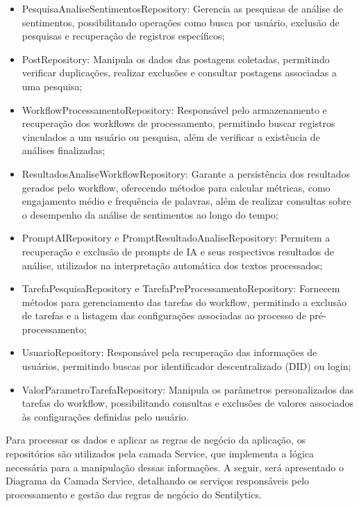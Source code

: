 \documentclass[
	12pt,				%
	oneside,			%
	a4paper,			%
	english,			%
	french,				%
	spanish,			%
	brazil				%
	]{abntex2}
\begin{document}
\begin{itemize}
\tightlist
\item
  PesquisaAnaliseSentimentosRepository: Gerencia as pesquisas de análise
  de sentimentos, possibilitando operações como busca por usuário,
  exclusão de pesquisas e recuperação de registros específicos;
\item
  PostRepository: Manipula os dados das postagens coletadas, permitindo
  verificar duplicações, realizar exclusões e consultar postagens
  associadas a uma pesquisa;
\item
  WorkflowProcessamentoRepository: Responsável pelo armazenamento e
  recuperação dos workflows de processamento, permitindo buscar
  registros vinculados a um usuário ou pesquisa, além de verificar a
  existência de análises finalizadas;
\item
  ResultadosAnaliseWorkflowRepository: Garante a persistência dos
  resultados gerados pelo workflow, oferecendo métodos para calcular
  métricas, como engajamento médio e frequência de palavras, além de
  realizar consultas sobre o desempenho da análise de sentimentos ao
  longo do tempo;
\item
  PromptAIRepository e PromptResultadoAnaliseRepository: Permitem a
  recuperação e exclusão de prompts de IA e seus respectivos resultados
  de análise, utilizados na interpretação automática dos textos
  processados;
\item
  TarefaPesquisaRepository e TarefaPreProcessamentoRepository: Fornecem
  métodos para gerenciamento das tarefas do workflow, permitindo a
  exclusão de tarefas e a listagem das configurações associadas ao
  processo de pré-processamento;
\item
  UsuarioRepository: Responsável pela recuperação das informações de
  usuários, permitindo buscas por identificador descentralizado (DID) ou
  login;
\item
  ValorParametroTarefaRepository: Manipula os parâmetros personalizados
  das tarefas do workflow, possibilitando consultas e exclusões de
  valores associados às configurações definidas pelo usuário.
\end{itemize}

Para processar os dados e aplicar as regras de negócio da aplicação, os
repositórios são utilizados pela camada Service, que implementa a lógica
necessária para a manipulação dessas informações. A seguir, será
apresentado o Diagrama da Camada Service, detalhando os serviços
responsáveis pelo processamento e gestão das regras de negócio do
Sentilytics.
\end{document}
